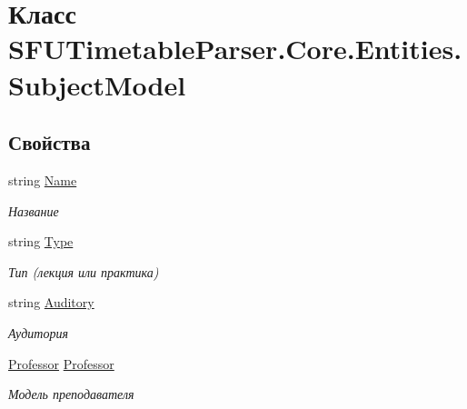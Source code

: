 \hypertarget{class_s_f_u_timetable_parser_1_1_core_1_1_entities_1_1_subject_model}{}\section{Класс S\+F\+U\+Timetable\+Parser.\+Core.\+Entities.\+Subject\+Model}
\label{class_s_f_u_timetable_parser_1_1_core_1_1_entities_1_1_subject_model}
\subsection*{Свойства}
\begin{DoxyCompactItemize}
\item 
string \hyperlink{class_s_f_u_timetable_parser_1_1_core_1_1_entities_1_1_subject_model_aa9ff8815894d5afab78f96d88e4af542}{Name}
\begin{DoxyCompactList}\small\item\em Название \end{DoxyCompactList}\item 
string \hyperlink{class_s_f_u_timetable_parser_1_1_core_1_1_entities_1_1_subject_model_a7852f100383c1d51c859d5386944401a}{Type}
\begin{DoxyCompactList}\small\item\em Тип (лекция или практика) \end{DoxyCompactList}\item 
string \hyperlink{class_s_f_u_timetable_parser_1_1_core_1_1_entities_1_1_subject_model_ae36a75954dccfdc388ef3cbdfc1a05ac}{Auditory}
\begin{DoxyCompactList}\small\item\em Аудитория \end{DoxyCompactList}\item 
\hyperlink{class_s_f_u_timetable_parser_1_1_core_1_1_entities_1_1_professor}{Professor} \hyperlink{class_s_f_u_timetable_parser_1_1_core_1_1_entities_1_1_subject_model_ac0d805823baea8d8b5330ca0ab70593b}{Professor}
\begin{DoxyCompactList}\small\item\em Модель преподавателя \end{DoxyCompactList}\end{DoxyCompactItemize}


